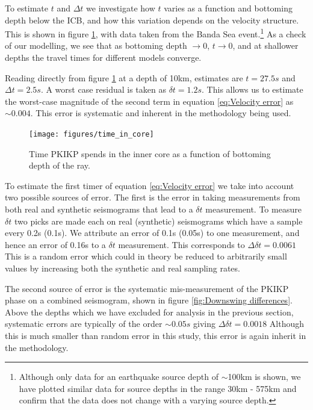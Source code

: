 \documentclass[11pt,a4paper]{article}
\begin{document}
To estimate $t$ and $\Delta t$ we investigate how $t$ varies as a function and bottoming depth below the ICB, and how this variation depends on the velocity structure. This is shown in figure \ref{fig:Time in core}, with data taken from the Banda Sea event.\footnote{Although only data for an earthquake source depth of $\sim$100km is shown, we have plotted similar data for source depths in the range 30km - 575km and confirm that the data does not change with a varying source depth.} As a check of our modelling, we see that as bottoming depth $\rightarrow 0$, $t \rightarrow 0$, and at shallower depths the travel times for different models converge. 

Reading directly from figure \ref{fig:Time in core} at a depth of 10km, estimates are $t = 27.5s$ and $\Delta t = 2.5s$. A worst case residual is taken as $\delta t = 1.2s$. This allows us to estimate the worst-case magnitude of the second term in equation \eqref{eq:Velocity error} as $\sim 0.004$. This error is systematic and inherent in the methodology being used.

\begin{figure}
	\centering
	\texttt{[image: figures/time\_in\_core]}
	\caption{Time PKIKP spends in the inner core as a function of bottoming depth of the ray.}
	\label{fig:Time in core}
\end{figure}

To estimate the first timer of equation \eqref{eq:Velocity error} we take into account two possible sources of error. The first is the error in taking measurements from both real and synthetic seismograms that lead to a $\delta t$ measurement. To measure $\delta t$ two picks are made each on real (synthetic) seismograms which have a sample every 0.2s (0.1s). We attribute an error of 0.1s (0.05s) to one measurement, and hence an error of 0.16s to a $\delta t$ measurement. This corresponds to $\Delta \delta t = 0.0061$ This is a random error which could in theory be reduced to arbitrarily small values by increasing both the synthetic and real sampling rates.

The second source of error is the systematic mis-measurement of the PKIKP phase on a combined seismogram, shown in figure \ref{fig:Downswing differences}. Above the depths which we have excluded for analysis in the previous section, systematic errors are typically of the order $\sim 0.05s$ giving $\Delta \delta t = 0.0018$ Although this is much smaller than random error in this study, this error is again inherit in the methodology.
\end{document}

